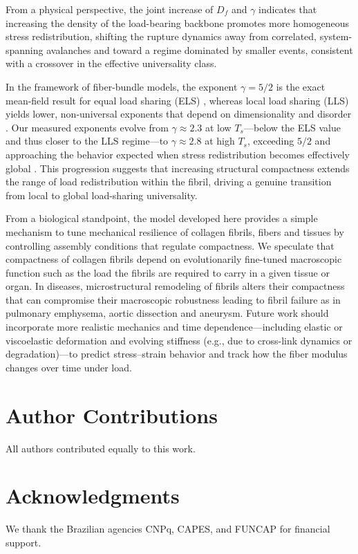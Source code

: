 \documentclass[aps,physrev,preprint,groupedaddress,linenumbers]{revtex4-2}
\begin{document}
From a physical perspective, the joint increase of $D_f$ and $\gamma$ indicates that increasing the density of the load-bearing backbone promotes more homogeneous stress redistribution, shifting the rupture dynamics away from correlated, system-spanning avalanches and toward a regime dominated by smaller events, consistent with a crossover in the effective universality class. 

In the framework of fiber-bundle models, the exponent $\gamma=5/2$ is the exact mean-field result for equal load sharing (ELS) \cite{Hemmer1992,Hansen1994,Kloster1997}, whereas local load sharing (LLS) yields lower, non-universal exponents that depend on dimensionality and disorder \cite{Hidalgo2002,Pradhan2005,Biswas2013,Danku2018}. Our measured exponents evolve from $\gamma\approx 2.3$ at low $T_s$---below the ELS value and thus closer to the LLS regime---to $\gamma\approx 2.8$ at high $T_s$, exceeding $5/2$ and approaching the behavior expected when stress redistribution becomes effectively global \cite{Pradhan2010}. This progression suggests that increasing structural compactness extends the range of load redistribution within the fibril, driving a genuine transition from local to global load-sharing universality. 

From a biological standpoint, the model developed here provides a simple mechanism to tune mechanical resilience of collagen fibrils, fibers and tissues by controlling assembly conditions that regulate compactness. We speculate that compactness of collagen fibrils depend on evolutionarily fine-tuned macroscopic function such as the load the fibrils are required to carry in a given tissue or organ. In diseases, microstructural remodeling of fibrils alters their compactness that can compromise their macroscopic robustness leading to fibril failure as in pulmonary emphysema, aortic dissection and aneurysm. Future work should incorporate more realistic mechanics and time dependence---including elastic or viscoelastic deformation and evolving stiffness (e.g., due to cross-link dynamics or degradation)---to predict stress--strain behavior and track how the fiber modulus changes over time under load.

\section{Author Contributions}
All authors contributed equally to this work.

\section{Acknowledgments}
We thank the Brazilian agencies CNPq, CAPES, and FUNCAP for financial support.
\end{document}
